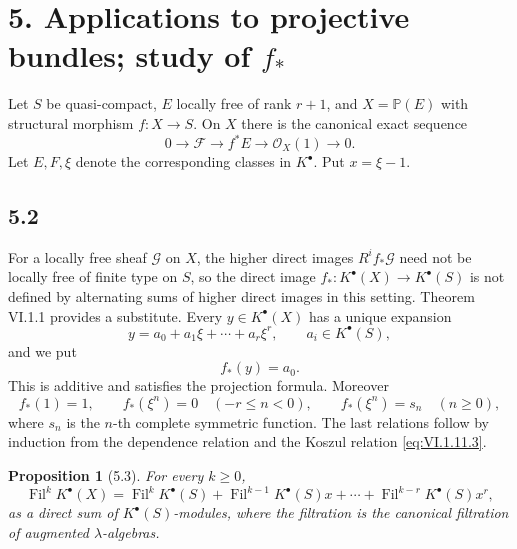 \documentclass[13pt]{extarticle}
\newcommand{\cO}{\mathcal O}
\newcommand{\Fil}{\operatorname{Fil}}
\newtheorem*{proposition}{Proposition}
\begin{document}
\section*{5. Applications to projective bundles; study of $f_*$}

Let $S$ be quasi-compact, $E$ locally free of rank $r+1$, and $X=\mathbb P(E)$ with structural morphism $f:X\to S$. On $X$ there is the canonical exact sequence
\[
0\to \mathcal F\to f^*E\to\cO_X(1)\to 0.
\]
Let $E,F,\xi$ denote the corresponding classes in $K^{\bullet}$. Put $x=\xi-1$.

\subsection*{5.2}
For a locally free sheaf $\mathcal G$ on $X$, the higher direct images $R^if_*\mathcal G$ need not be locally free of finite type on $S$, so the direct image $f_*:K^{\bullet}(X)\to K^{\bullet}(S)$ is not defined by alternating sums of higher direct images in this setting. Theorem VI.1.1 provides a substitute. Every $y\in K^{\bullet}(X)$ has a unique expansion
\begin{equation}\label{eq:VI.5.2.1}
y=a_0+a_1\xi+\cdots+a_r\xi^r,
\qquad a_i\in K^{\bullet}(S),
\end{equation}
and we put
\begin{equation}\label{eq:VI.5.2.2}
f_*(y)=a_0.
\end{equation}
This is additive and satisfies the projection formula. Moreover
\begin{equation}\label{eq:VI.5.2.3}
f_*(1)=1,
\qquad
f_*(\xi^n)=0\quad(-r\leq n<0),
\qquad
f_*(\xi^n)=s_n\quad(n\geq 0),
\end{equation}
where $s_n$ is the $n$-th complete symmetric function. The last relations follow by induction from the dependence relation and the Koszul relation \eqref{eq:VI.1.11.3}.

\begin{proposition}[5.3]\label{prop:VI.5.3}
For every $k\geq 0$,
\begin{equation}\label{eq:VI.5.3}
\Fil^kK^{\bullet}(X)=\Fil^kK^{\bullet}(S)+\Fil^{k-1}K^{\bullet}(S)x+\cdots+\Fil^{k-r}K^{\bullet}(S)x^r,
\end{equation}
as a direct sum of $K^{\bullet}(S)$-modules, where the filtration is the canonical filtration of augmented $\lambda$-algebras.
\end{proposition}
\end{document}
